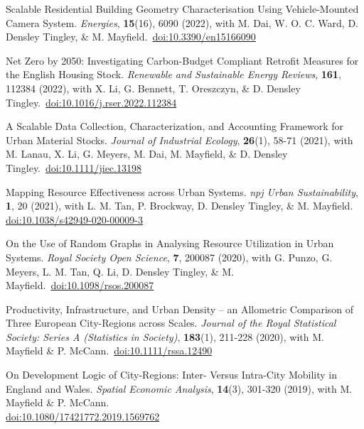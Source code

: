 \documentclass[10pt]{article}
\begin{document}
\begin{etaremune}[leftmargin=0ex, topsep=0ex]
	\item Scalable Residential Building Geometry Characterisation Using Vehicle-Mounted Camera System. \emph{Energies}, \textbf{15}(16), 6090 (2022), with M. Dai, W. O. C. Ward, D. Densley Tingley, \& M. Mayfield.~\href{https://doi.org/10.3390/en15166090}{doi:10.3390/en15166090}

	\item Net Zero by 2050: Investigating Carbon-Budget Compliant Retrofit Measures for the English Housing Stock. \emph{Renewable and Sustainable Energy Reviews}, \textbf{161}, 112384 (2022), with X. Li, G. Bennett, T. Oreszczyn, \& D. Densley Tingley.~\href{https://doi.org/10.1016/j.rser.2022.112384}{doi:10.1016/j.rser.2022.112384}

	\item A Scalable Data Collection, Characterization, and Accounting Framework for Urban Material Stocks. \emph{Journal of Industrial Ecology}, \textbf{26}(1), 58-71 (2021), with M. Lanau, X. Li, G. Meyers, M. Dai, M. Mayfield, \& D. Densley Tingley.~\href{http://dx.doi.org/10.1111/jiec.13198}{doi:10.1111/jiec.13198}
	
	\item Mapping Resource Effectiveness across Urban Systems. \emph{npj Urban Sustainability}, \textbf{1}, 20 (2021), with L. M. Tan, P. Brockway, D. Densley Tingley, \& M. Mayfield.~\\\href{http://dx.doi.org/10.1038/s42949-020-00009-3}{doi:10.1038/s42949-020-00009-3}

	\item On the Use of Random Graphs in Analysing Resource Utilization in Urban Systems. \emph{Royal Society Open Science}, \textbf{7}, 200087 (2020), with G. Punzo, G. Meyers, L. M. Tan, Q. Li, D. Densley Tingley, \& M. Mayfield.~\href{http://dx.doi.org/10.1098/rsos.200087}{doi:10.1098/rsos.200087}
	
	\item Productivity, Infrastructure, and Urban Density -- an Allometric Comparison of Three European City-Regions across Scales. \emph{Journal of the Royal Statistical Society: Series A (Statistics in Society)}, \textbf{183}(1), 211-228 (2020), with M. Mayfield \& P. McCann.~\href{https://doi.org/10.1111/rssa.12490}{doi:10.1111/rssa.12490}
		
	\item On Development Logic of City-Regions: Inter- Versus Intra-City Mobility in England and Wales. \emph{Spatial Economic Analysis}, \textbf{14}(3), 301-320 (2019), with M. Mayfield \& P. McCann.~\\\href{https://doi.org/10.1080/17421772.2019.1569762}{doi:10.1080/17421772.2019.1569762}
	

\end{etaremune}
\end{document}
